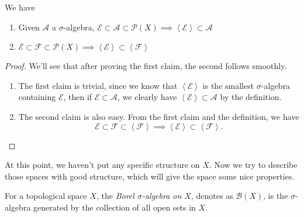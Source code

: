 \begin{lemma}
	\label{lemma-2}
	We have
	\begin{enumerate}
		\item Given \(\mathcal{A}\) a \(\sigma\)-algebra, \(\mathcal{E} \subset \mathcal{A} \subset \mathcal{P} (X)\implies \left<\mathcal{E}\right> \subset \mathcal{A} \)
		\item \(\mathcal{E} \subset \mathcal{F} \subset \mathcal{P} (X)\implies \left<\mathcal{E}\right> \subset\left<\mathcal{F} \right>\)
	\end{enumerate}
\end{lemma}
\begin{proof}
	We'll see that after proving the first claim, the second follows smoothly.
	\begin{enumerate}
		\item The first claim is trivial, since we know that \(\left<\mathcal{E} \right>\) is the smallest \(\sigma\)-algebra containing \(\mathcal{E} \),
		      then if \(\mathcal{E} \subset \mathcal{A} \), we clearly have \(\left<\mathcal{E} \right>\subset \mathcal{A} \) by the definition.
		\item The second claim is also easy. From the first claim and the definition, we have
		      \[
			      \mathcal{E} \subset \mathcal{F} \subset \left< \mathcal{F} \right> \implies \left< \mathcal{E} \right>\subset \left< \mathcal{F} \right>.
		      \]
	\end{enumerate}
\end{proof}

At this point, we haven't put any specific structure on \(X\). Now we try to describe those spaces with good structure, which will give the space some nice properties.

\begin{definition}
	For a topological space \(X\), the \emph{Borel \(\sigma\)-algebra on \(X\)}, denotes as \(\mathcal{B}(X)\),
	is the \(\sigma\)-algebra generated by the collection of all open sets in \(X\).
\end{definition}

